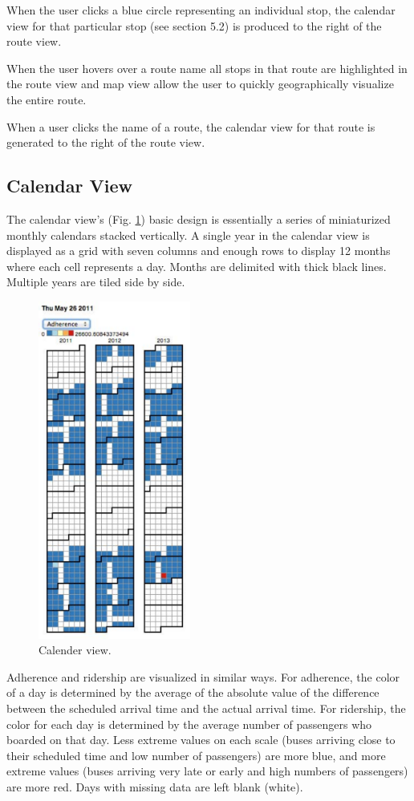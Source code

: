 \documentclass[journal]{vgtc}                %
\begin{document}
When the user clicks a blue circle representing an individual stop, the calendar view for that particular stop (see section 5.2) is produced to the right of the route view.

When the user hovers over a route name all stops in that route are highlighted in the route view and map view allow the user to quickly geographically visualize the entire route.

When a user clicks the name of a route, the calendar view for that route is generated to the right of the route view.

\subsection{Calendar View}
The calendar view's (Fig. \ref{calendar_view}) basic design is essentially a series of miniaturized monthly calendars stacked vertically. A single year in the calendar view is displayed as a grid with seven columns and enough rows to display 12 months where each cell represents a day. Months are delimited with thick black lines. Multiple years are tiled side by side.

\begin{figure}[htb]
 \centering
 \includegraphics[width=5cm]{img/image02}
 \caption{Calender view.}
 \label{calendar_view}
\end{figure}

Adherence and ridership are visualized in similar ways. For adherence, the color of a day is determined by the average of the absolute value of the difference between the scheduled arrival time and the actual arrival time. For ridership, the color for each day is determined by the average number of passengers who boarded on that day. Less extreme values on each scale (buses arriving close to their scheduled time and low number of passengers) are more blue, and more extreme values (buses arriving very late or early and high numbers of passengers) are more red. Days with missing data are left blank (white).
\end{document}

